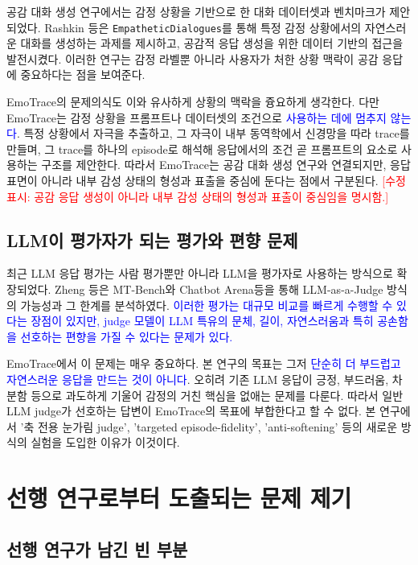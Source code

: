 ﻿\documentclass[11pt,a4paper]{article}
\newcommand{\eng}[1]{\texttt{#1}}
\begin{document}
공감 대화 생성 연구에서는 감정 상황을 기반으로 한 대화 데이터셋과 벤치마크가 제안되었다. Rashkin 등은 \eng{EmpatheticDialogues}를 통해 특정 감정 상황에서의 자연스러운 대화를 생성하는 과제를 제시하고, 공감적 응답 생성을 위한 데이터 기반의 접근을 발전시켰다\cite{rashkin2019}. 이러한 연구는 감정 라벨뿐 아니라 사용자가 처한 상황 맥락이 공감 응답에 중요하다는 점을 보여준다.

EmoTrace의 문제의식도 이와 유사하게 상황의 맥락을 즁요하게 생각한다. 다만 EmoTrace는 감정 상황을 프롬프트나 데이터셋의 조건으로 \textcolor{blue}{사용하는 데에 멈추지 않는다}. 특정 상황에서 자극을 추출하고, 그 자극이 내부 동역학에서 신경망을 따라 trace를 만들며, 그 trace를 하나의 episode로 해석해 응답에서의 조건 곧 프롬프트의 요소로 사용하는 구조를 제안한다. 따라서 EmoTrace는 공감 대화 생성 연구와 연결되지만, 응답 표면이 아니라 내부 감성 상태의 형성과 표출을 중심에 둔다는 점에서 구분된다. \textcolor{red}{[수정 표시: 공감 응답 생성이 아니라 내부 감성 상태의 형성과 표출이 중심임을 명시함.]}

\subsection{LLM이 평가자가 되는 평가와 편향 문제}

최근 LLM 응답 평가는 사람 평가뿐만 아니라 LLM을 평가자로 사용하는 방식으로 확장되었다. Zheng 등은 MT-Bench와 Chatbot Arena등을 통해 LLM-as-a-Judge 방식의 가능성과 그 한계를 분석하였다\cite{zheng2023}. \textcolor{blue}{이러한 평가는 대규모 비교를 빠르게 수행할 수 있다는 장점이 있지만, judge 모델이 LLM 특유의 문체, 길이, 자연스러움과 특히 공손함을 선호하는 편향을 가질 수 있다는 문제가 있다.}

EmoTrace에서 이 문제는 매우 중요하다. 본 연구의 목표는 그저 \textcolor{blue}{단순히 더 부드럽고 자연스러운 응답을 만드는 것이 아니다}. 오히려 기존 LLM 응답이 긍정, 부드러움, 차분함 등으로 과도하게 기울어 감정의 거친 핵심을 없애는 문제를 다룬다. 따라서 일반 LLM judge가 선호하는 답변이 EmoTrace의 목표에 부합한다고 할 수 없다. 본 연구에서 '축 전용 눈가림 judge', 'targeted episode-fidelity', 'anti-softening' 등의 새로운 방식의 실험을 도입한 이유가 이것이다.

\section{선행 연구로부터 도출되는 문제 제기}

\subsection{선행 연구가 남긴 빈 부분}
\end{document}
